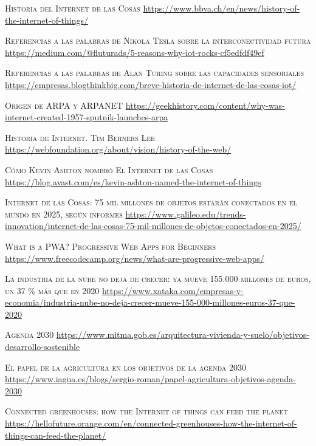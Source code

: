 \documentclass[a4paper, 12pt, oneside]{book}
\begin{document}
\begin{thebibliography}{X}

 \textsc{Historia del Internet de las Cosas}
\url{https://www.bbva.ch/en/news/history-of-the-internet-of-things/}

 \textsc{Referencias a las palabras de Nikola Tesla sobre la interconectividad futura}
\url{https://medium.com/@fluturads/5-reasons-why-iot-rocks-cf5edfdf49ef}

 \textsc{Referencias a las palabras de Alan Turing sobre las capacidades sensoriales}
\url{https://empresas.blogthinkbig.com/breve-historia-de-internet-de-las-cosas-iot/}

 \textsc{Origen de ARPA y ARPANET}
\url{https://geekhistory.com/content/why-was-internet-created-1957-sputnik-launches-arpa}

 \textsc{Historia de Internet. Tim Berners Lee}
\url{https://webfoundation.org/about/vision/history-of-the-web/}

 \textsc{Cómo Kevin Ashton nombró El Internet de las Cosas}
\url{https://blog.avast.com/es/kevin-ashton-named-the-internet-of-things}

 \textsc{Internet de las Cosas: 75 mil millones de objetos estarán conectados en el mundo en 2025, según informes}
\url{https://www.galileo.edu/trends-innovation/internet-de-las-cosas-75-mil-millones-de-objetos-conectados-en-2025/}

 \textsc{What is a PWA? Progressive Web Apps for Beginners}
\url{https://www.freecodecamp.org/news/what-are-progressive-web-apps/}

 \textsc{La industria de la nube no deja de crecer: ya mueve 155.000 millones de euros, un 37 \% más que en 2020}
\url{https://www.xataka.com/empresas-y-economia/industria-nube-no-deja-crecer-mueve-155-000-millones-euros-37-que-2020}

 \textsc{Agenda 2030}
\url{https://www.mitma.gob.es/arquitectura-vivienda-y-suelo/objetivos-desarrollo-sostenible}

\textsc{El papel de la agricultura en los objetivos de la agenda 2030}
\url{https://www.iagua.es/blogs/sergio-roman/papel-agricultura-objetivos-agenda-2030}

\textsc{Connected greenhouses: how the Internet of things can feed the planet}
\url{https://hellofuture.orange.com/en/connected-greenhouses-how-the-internet-of-things-can-feed-the-planet/}


\end{thebibliography}
\end{document}
